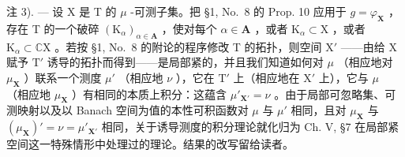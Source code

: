 注 3). --- 设 X 是 T 的 \(\mu\) -可测子集。把 §1, No.~8 的 Prop. 10 应用于 \(g = \varphi_{\mathbf{X}}\) ，存在 T 的一个破碎 \((\mathrm{K}_{\alpha})_{\alpha \in \mathbf{A}}\) ，使对每个 \(\alpha \in \mathbf{A}\) ，或者 \(\mathrm{K}_{\alpha} \subset \mathrm{X}\) ，或者 \(\mathrm{K}_{\alpha} \subset \mathbb{C}\mathrm{X}\) 。若按 §1, No.~8 的附论的程序修改 T 的拓扑，则空间 \(\mathrm{X}'\) ——由给 X 赋予 \(\mathrm{T}'\) 诱导的拓扑而得到——是局部紧的，并且我们知道如何对 \(\mu\) （相应地对 \(\mu_{\mathbf{X}}\) ）联系一个测度 \(\mu'\) （相应地 \(\nu\) ），它在 \(\mathrm{T}'\) 上（相应地在 \(\mathrm{X}'\) 上），它与 \(\mu\) （相应地 \(\mu_{\mathbf{X}}\) ）有相同的本质上积分：这蕴含 \(\mu'_{\mathbf{X}'} = \nu\) 。由于局部可忽略集、可测映射以及以 Banach 空间为值的本性可积函数对 \(\mu\) 与 \(\mu'\) 相同，且对 \(\mu_{\mathbf{X}}\) 与 \((\mu_{\mathbf{X}})' = \nu = \mu'_{\mathbf{X}'}\) 相同，关于诱导测度的积分理论就化归为 Ch. V, §7 在局部紧空间这一特殊情形中处理过的理论。结果的改写留给读者。
\relax{}
